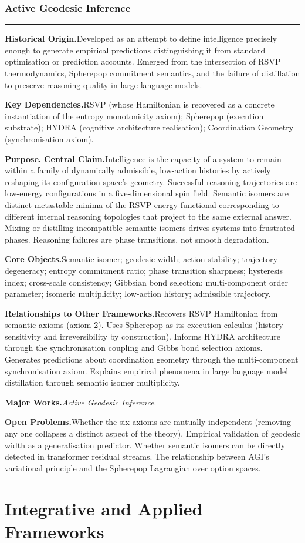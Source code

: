 \documentclass[12pt, twoside]{article}
\newcommand{\frameworkhead}[5]{  \subsubsection{#1}
  \noindent\textcolor{#2}{\rule{\linewidth}{0.8pt}}
  \smallskip

  \noindent\textbf{Historical Origin.}\quad #3

  \noindent\textbf{Key Dependencies.}\quad #4

  \noindent\textbf{Purpose.}\quad #5
}
\newcommand{\frameworkbody}[5]{  \noindent\textbf{Central Claim.}\quad #1

  \noindent\textbf{Core Objects.}\quad #2

  \noindent\textbf{Relationships to Other Frameworks.}\quad #3

  \noindent\textbf{Major Works.}\quad #4

  \noindent\textbf{Open Problems.}\quad #5
  \medskip
}
\begin{document}
\frameworkhead{Active Geodesic Inference}{formalismgray}{Developed as an attempt to define intelligence precisely enough to
generate empirical predictions distinguishing it from standard optimisation
or prediction accounts. Emerged from the intersection of RSVP thermodynamics,
Spherepop commitment semantics, and the failure of distillation to preserve
reasoning quality in large language models.}{RSVP (whose Hamiltonian is recovered as a concrete instantiation of the
entropy monotonicity axiom); Spherepop (execution substrate); HYDRA
(cognitive architecture realisation); Coordination Geometry (synchronisation
axiom).}
\frameworkbody{Intelligence is the capacity of a system to remain within a
family of dynamically admissible, low-action histories by actively reshaping
its configuration space's geometry. Successful reasoning trajectories are
low-energy configurations in a five-dimensional spin field. Semantic isomers
are distinct metastable minima of the RSVP energy functional corresponding
to different internal reasoning topologies that project to the same external
answer. Mixing or distilling incompatible semantic isomers drives systems
into frustrated phases. Reasoning failures are phase transitions, not smooth
degradation.}{Semantic isomer; geodesic width; action stability; trajectory degeneracy;
entropy commitment ratio; phase transition sharpness; hysteresis index;
cross-scale consistency; Gibbsian bond selection; multi-component order
parameter; isomeric multiplicity; low-action history; admissible trajectory.}{Recovers RSVP Hamiltonian from semantic axioms (axiom 2). Uses Spherepop
as its execution calculus (history sensitivity and irreversibility by
construction). Informs HYDRA architecture through the synchronisation
coupling and Gibbs bond selection axioms. Generates predictions about
coordination geometry through the multi-component synchronisation axiom.
Explains empirical phenomena in large language model distillation through
semantic isomer multiplicity.}{\emph{Active Geodesic Inference}.}{Whether the six axioms are mutually independent (removing any one collapses
a distinct aspect of the theory). Empirical validation of geodesic width as
a generalisation predictor. Whether semantic isomers can be directly detected
in transformer residual streams. The relationship between AGI's variational
principle and the Spherepop Lagrangian over option spaces.}

\section{Integrative and Applied Frameworks}
\end{document}
